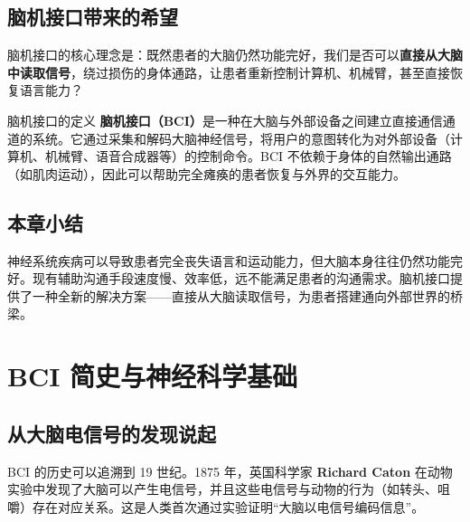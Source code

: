\documentclass[a4paper]{article}
\begin{document}
\subsection{脑机接口带来的希望}




脑机接口的核心理念是：既然患者的大脑仍然功能完好，我们是否可以\textbf{直接从大脑中读取信号}，绕过损伤的身体通路，让患者重新控制计算机、机械臂，甚至直接恢复语言能力？

\begin{knowledgebox}{脑机接口的定义}
\textbf{脑机接口（BCI）}是一种在大脑与外部设备之间建立直接通信通道的系统。它通过采集和解码大脑神经信号，将用户的意图转化为对外部设备（计算机、机械臂、语音合成器等）的控制命令。BCI 不依赖于身体的自然输出通路（如肌肉运动），因此可以帮助完全瘫痪的患者恢复与外界的交互能力。
\end{knowledgebox}

\subsection{本章小结}

神经系统疾病可以导致患者完全丧失语言和运动能力，但大脑本身往往仍然功能完好。现有辅助沟通手段速度慢、效率低，远不能满足患者的沟通需求。脑机接口提供了一种全新的解决方案——直接从大脑读取信号，为患者搭建通向外部世界的桥梁。


\section{BCI 简史与神经科学基础}

\subsection{从大脑电信号的发现说起}




BCI 的历史可以追溯到 19 世纪。1875 年，英国科学家 \textbf{Richard Caton} 在动物实验中发现了大脑可以产生电信号，并且这些电信号与动物的行为（如转头、咀嚼）存在对应关系。这是人类首次通过实验证明``大脑以电信号编码信息''。
\end{document}
